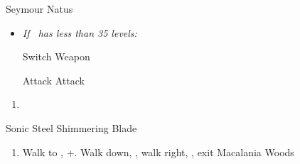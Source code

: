 \begin{battle}[36000]{Seymour Natus}
\begin{itemize}
	\item \textit{If \lulu\ has less than 35 levels:}
	\begin{itemize}
		\switch{\tidus}{\lulu}
		\luluf Switch Weapon
		\switch{\lulu}{\tidus}
	\end{itemize}
	\tidusf Attack
	\summon{\bahamut}
	\bahamutf Attack
\end{itemize}
\end{battle}
\begin{enumerate}[resume]
	\item \sd
\end{enumerate}
\begin{equip}
\begin{itemize}
	\tidusf Sonic Steel
	\auronf Shimmering Blade
\end{itemize}
\end{equip}
\begin{enumerate}[resume]
	\item Walk to \yuna, \cs+\skippablefmv[10:10]. Walk down, \cs[1:40], walk right, \save, exit Macalania Woods
\end{enumerate}	